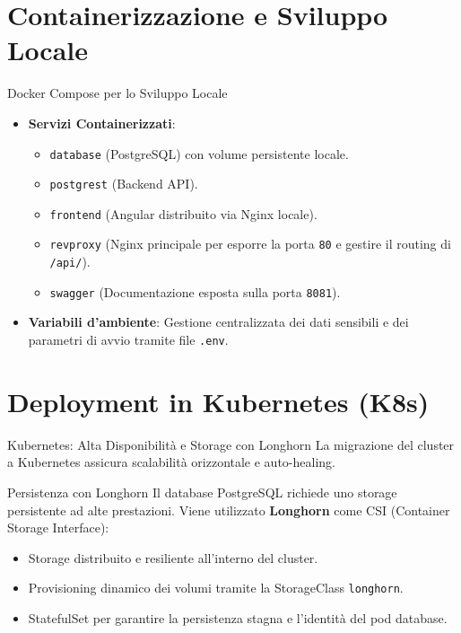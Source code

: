 \documentclass[aspectratio=169]{beamer}
\begin{document}
\section{Containerizzazione e Sviluppo Locale}

\begin{frame}{Docker Compose per lo Sviluppo Locale}
    \begin{itemize}
        \item \textbf{Servizi Containerizzati}:
            \begin{itemize}
                \item \texttt{database} (PostgreSQL) con volume persistente locale.
                \item \texttt{postgrest} (Backend API).
                \item \texttt{frontend} (Angular distribuito via Nginx locale).
                \item \texttt{revproxy} (Nginx principale per esporre la porta \texttt{80} e gestire il routing di \texttt{/api/}).
                \item \texttt{swagger} (Documentazione esposta sulla porta \texttt{8081}).
            \end{itemize}
        \item \textbf{Variabili d'ambiente}: Gestione centralizzata dei dati sensibili e dei parametri di avvio tramite file \texttt{.env}.
    \end{itemize}
\end{frame}

\section{Deployment in Kubernetes (K8s)}

\begin{frame}{Kubernetes: Alta Disponibilità e Storage con Longhorn}
    La migrazione del cluster a Kubernetes assicura scalabilità orizzontale e auto-healing.
    \begin{block}{Persistenza con Longhorn}
        Il database PostgreSQL richiede uno storage persistente ad alte prestazioni. Viene utilizzato \textbf{Longhorn} come CSI (Container Storage Interface):
        \begin{itemize}
            \item Storage distribuito e resiliente all'interno del cluster.
            \item Provisioning dinamico dei volumi tramite la StorageClass \texttt{longhorn}.
            \item StatefulSet per garantire la persistenza stagna e l'identità del pod database.
        \end{itemize}
    \end{block}
\end{frame}
\end{document}
